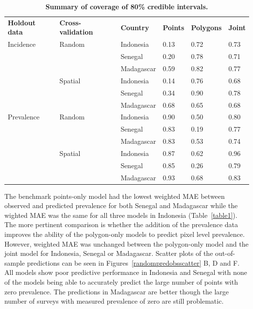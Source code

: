 \documentclass[10pt,letterpaper]{article}
\newlength\savedwidth
\newcommand\thickhline{\noalign{\global\savedwidth\arrayrulewidth\global\arrayrulewidth 2pt}%
\hline
\noalign{\global\arrayrulewidth\savedwidth}}
\begin{document}
\begin{table}[t]
\begin{adjustwidth}{-2.25in}{0in} %
\centering
\caption{
{\bf Summary of coverage of 80\% credible intervals.}}
\begin{tabular}{llllll}
\hline
{\bf Holdout data} & {\bf Cross-validation} & {\bf Country} &  {\bf Points} & {\bf Polygons} & {\bf Joint} \\
\thickhline 
Incidence & Random & Indonesia & 0.13 & 0.72 &  0.73\\
&& Senegal & 0.20 & 0.78 &  0.71\\
&& Madagascar & 0.59 & 0.82 &  0.77\vspace{1mm}\\
& Spatial & Indonesia & 0.14 & 0.76 &  0.68\\
&& Senegal & 0.34 & 0.90 &  0.78\\
&& Madagascar & 0.68 & 0.65 &  0.68\vspace{3mm} \\
Prevalence & Random & Indonesia & 0.90 & 0.50 &  0.80\\
&& Senegal & 0.83 & 0.19 &  0.77\\
&& Madagascar & 0.83 & 0.53 &  0.74\vspace{1mm}\\
& Spatial & Indonesia & 0.87 & 0.62 &  0.96\\
&& Senegal & 0.85 & 0.26 &  0.79\\
&& Madagascar & 0.93 & 0.68 &  0.83\\
\end{tabular}
\begin{flushleft}

\end{flushleft}
\label{table3}
\end{adjustwidth}
\end{table}


The benchmark points-only model had the lowest weighted MAE between observed and predicted prevalence for both Senegal and  Madagascar while the wighted MAE was the same for all three models in Indonesia (Table~\ref{table1}).
The more pertinent comparison is whether the addition of the prevalence data improves the ability of the polygon-only models to predict pixel level prevalence.
However, weighted MAE was unchanged between the polygon-only model and the joint model for Indonesia, Senegal or Madagascar.
Scatter plots of the out-of-sample predictions can be seen in Figures~\ref{randompredobsscatter} B, D and F.
All models show poor predictive performance in Indonesia and Senegal with none of the models being able to accurately predict the large number of points with zero prevalence.
The predictions in Madagascar are better though the large number of surveys with measured prevalence of zero are still problematic. 
\end{document}
